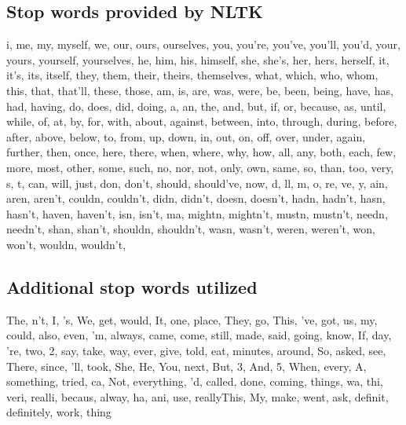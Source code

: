 \documentclass[sigconf]{acmart}
\begin{document}
\subsection{Stop words provided by NLTK}
i, me, my, myself, we, our, ours, ourselves, you, you're, you've, you'll, you'd, your, yours, yourself, yourselves, he, him, his, himself, she, she's, her, hers, herself, it, it's, its, itself, they, them, their, theirs, themselves, what, which, who, whom, this, that, that'll, these, those, am, is, are, was, were, be, been, being, have, has, had, having, do, does, did, doing, a, an, the, and, but, if, or, because, as, until, while, of, at, by, for, with, about, against, between, into, through, during, before, after, above, below, to, from, up, down, in, out, on, off, over, under, again, further, then, once, here, there, when, where, why, how, all, any, both, each, few, more, most, other, some, such, no, nor, not, only, own, same, so, than, too, very, s, t, can, will, just, don, don't, should, should've, now, d, ll, m, o, re, ve, y, ain, aren, aren't, couldn, couldn't, didn, didn't, doesn, doesn't, hadn, hadn't, hasn, hasn't, haven, haven't, isn, isn't, ma, mightn, mightn't, mustn, mustn't, needn, needn't, shan, shan't, shouldn, shouldn't, wasn, wasn't, weren, weren't, won, won't, wouldn, wouldn't, 

\subsection{Additional stop words utilized}
The, n't, I, 's, We, get, would, It, one, place, They, go, This, 've, got, us, my, could, also, even, 'm, always, came, come, still, made, said, going, know, If, day, 're, two, 2, say, take, way, ever, give, told, eat, minutes, around, So, asked, see, There, since, 'll, took, She, He, You, next, But, 3, And, 5, When, every, A, something, tried, ca, Not, everything, 'd, called, done, coming, things, wa, thi, veri, realli, becaus, alway, ha, ani, use, reallyThis, My, make, went, ask, definit, definitely, work, thing
\end{document}
